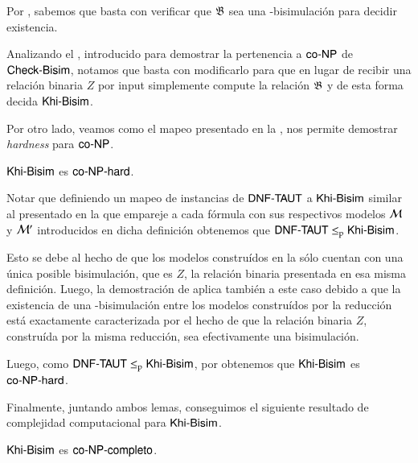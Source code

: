\begin{demostracion}
    Por , sabemos que basta con verificar que $\mathfrak{B}$ sea una \KHilogic-bisimulación para decidir existencia. 

    Analizando el , introducido para demostrar la pertenencia a $\rm\textsf{co-NP}$ de $\rm\textsf{Check-Bisim}$, notamos que 
    basta con modificarlo para que en lugar de recibir una relación binaria $Z$ por input simplemente compute la relación $\mathfrak{B}$ y de esta 
    forma decida $\rm\textsf{Khi-Bisim}$.
\end{demostracion}

Por otro lado, veamos como el mapeo presentado en la , nos permite demostrar \textit{hardness} para $\rm\textsf{co-NP}$.

\begin{lema}\label{lema:khi-bisim-conphard}
    $\rm\textsf{Khi-Bisim}$ es $\rm\textsf{co-NP-hard}$.
\end{lema}

\begin{demostracion}
    Notar que definiendo un mapeo de instancias de $\rm\textsf{DNF-TAUT}$ a $\rm\textsf{Khi-Bisim}$ similar al presentado en la  que 
    empareje a cada fórmula con sus respectivos modelos $\mathcal{M}$ y $\mathcal{M}'$ introducidos en dicha definición obtenemos que 
    $\rm\textsf{DNF-TAUT} \leq_p \rm\textsf{Khi-Bisim}$. 

    Esto se debe al hecho de que los modelos construídos en la  sólo cuentan con una única posible bisimulación, 
    que es $Z$, la relación binaria presentada en esa misma definición. Luego, la demostración de  aplica también 
    a este caso debido a que la existencia de una \KHilogic-bisimulación entre los modelos construídos por la reducción está exactamente 
    caracterizada por el hecho de que la relación binaria $Z$, construída por la misma reducción, sea efectivamente una bisimulación.

    Luego, como $\rm\textsf{DNF-TAUT} \leq_p \rm\textsf{Khi-Bisim}$, por  obtenemos que $\rm\textsf{Khi-Bisim}$ es $\rm\textsf{co-NP-hard}$.
\end{demostracion}

Finalmente, juntando ambos lemas, conseguimos el siguiente resultado de complejidad computacional para $\rm\textsf{Khi-Bisim}$.

\begin{teorema}\label{thm:khibisim-conpcomplete}
    $\rm\textsf{Khi-Bisim}$ es $\rm\textsf{co-NP-completo}$.
\end{teorema}

